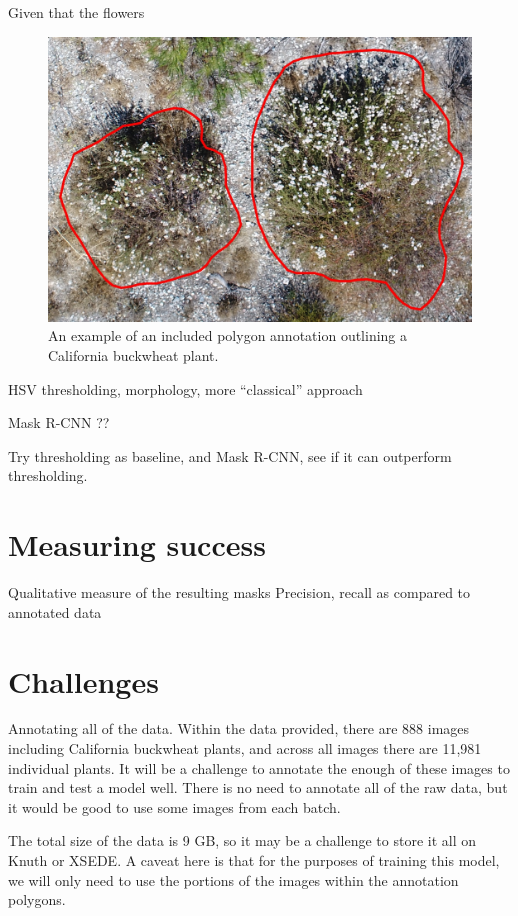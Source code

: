 \documentclass[10pt,twocolumn,letterpaper]{article}
\begin{document}
Given that the flowers 

\begin{figure}[t]
  \centering
   \includegraphics[width=0.9\linewidth]{annotation.jpg}
   \caption{An example of an included polygon annotation outlining a California buckwheat plant.}
   \label{fig:annotation}
\end{figure}

HSV thresholding, morphology, more ``classical'' approach

Mask R-CNN ??

Try thresholding as baseline, and Mask R-CNN, see if it can outperform thresholding.

\section{Measuring success}

Qualitative measure of the resulting masks
Precision, recall as compared to annotated data

\section{Challenges}

Annotating all of the data. Within the data provided, there are 888 images including California buckwheat plants, and across all images there are 11,981 individual plants. It will be a challenge to annotate the enough of these images to train and test a model well. There is no need to annotate all of the raw data, but it would be good to use some images from each batch.

The total size of the data is 9 GB, so it may be a challenge to store it all on Knuth or XSEDE. A caveat here is that for the purposes of training this model, we will only need to use the portions of the images within the annotation polygons.

{\small


}
\end{document}
